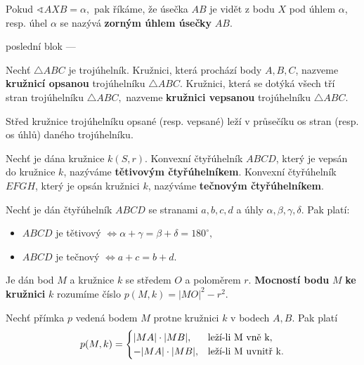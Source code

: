 \begin{pozn}
  Pokud $\sphericalangle AXB = \alpha,$ pak říkáme, že úsečka $AB$ je vidět z bodu $X$ pod úhlem $\alpha$, resp. úhel $\alpha$ se nazývá \textbf{zorným úhlem úsečky} $AB.$
\end{pozn}

poslední blok ---
\begin{definition}
  Nechť $\triangle ABC$ je trojúhelník. Kružnici, která prochází body $A,B,C$, nazveme \textbf{kružnicí opsanou} trojúhelníku $\triangle ABC.$ Kružnici, která se dotýká všech tří stran trojúhelníku $\triangle ABC,$ nazveme \textbf{kružnici vepsanou} trojúhelníku $\triangle ABC.$
\end{definition}

\begin{veta}
  Střed kružnice trojúhelníku opsané (resp. vepsané) leží v průsečíku os stran (resp. os úhlů) daného trojúhelníku.
\end{veta}

\begin{definition}
  Nechť je dána kružnice $k(S,r).$ Konvexní čtyřúhelník $ABCD$, který je vepsán do kružnice $k$, nazýváme \textbf{tětivovým čtyřúhelníkem}. Konvexní čtyřúhelník $EFGH$, který je opsán kružnici $k$, nazýváme \textbf{tečnovým čtyřúhelníkem}.
\end{definition}

\begin{veta}
  Nechť je dán čtyřúhelník $ABCD$ se stranami $a,b,c,d$ a úhly $\alpha, \beta, \gamma, \delta.$ Pak platí:
  \begin{itemize}
    \item $ABCD$ je tětivový $\iff \alpha + \gamma=\beta+\delta=180^\circ,$
    \item $ABCD$ je tečnový $\iff a+c=b+d.$
  \end{itemize}
\end{veta}

\begin{definition}
  Je dán bod $M$ a kružnice $k$ se středem $O$ a poloměrem $r$. \textbf{Mocností bodu} $M$ \textbf{ke kružnici} $k$ rozumíme číslo $p(M, k) = |MO|^2-r^2.$
\end{definition}

\begin{veta}
  Nechť přímka $p$ vedená bodem $M$ protne kružnici $k$ v bodech $A,B$. Pak platí
  \[
    p(M,k)=
    \begin{cases}
      |MA|\cdot |MB|, & \text{leží-li } $M$ \text{ vně } $k$, \\
      -|MA|\cdot |MB|, & \text{leží-li } $M$ \text{ uvnitř } $k$.
    \end{cases}
  \]
\end{veta}



